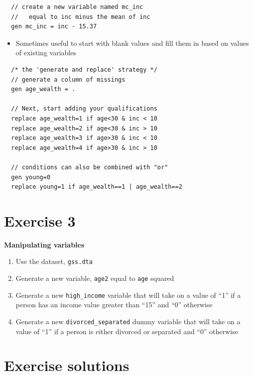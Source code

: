 \documentclass[]{book}
\providecommand{\tightlist}{%
  \setlength{\itemsep}{0pt}\setlength{\parskip}{0pt}}
\begin{document}
\begin{verbatim}
  // create a new variable named mc_inc
  //   equal to inc minus the mean of inc
  gen mc_inc = inc - 15.37  
\end{verbatim}

\begin{itemize}
\tightlist
\item
  Sometimes useful to start with blank values and fill them in based on
  values of existing variables
\end{itemize}

\begin{verbatim}
  /* the 'generate and replace' strategy */ 
  // generate a column of missings
  gen age_wealth = .

  // Next, start adding your qualifications
  replace age_wealth=1 if age<30 & inc < 10
  replace age_wealth=2 if age<30 & inc > 10
  replace age_wealth=3 if age>30 & inc < 10
  replace age_wealth=4 if age>30 & inc > 10

  // conditions can also be combined with "or"
  gen young=0
  replace young=1 if age_wealth==1 | age_wealth==2
\end{verbatim}

\section{Exercise 3}\label{exercise-3-3}

\textbf{Manipulating variables}

\begin{enumerate}
\def\labelenumi{\arabic{enumi}.}
\tightlist
\item
  Use the dataset, \texttt{gss.dta}
\item
  Generate a new variable, \texttt{age2} equal to \texttt{age} squared
\item
  Generate a new \texttt{high\_income} variable that will take on a
  value of ``1'' if a person has an income value greater than ``15'' and
  ``0'' otherwise
\item
  Generate a new \texttt{divorced\_separated} dummy variable that will
  take on a value of ``1'' if a person is either divorced or separated
  and ``0'' otherwise
\end{enumerate}

\section{Exercise solutions}\label{exercise-solutions-4}
\end{document}
